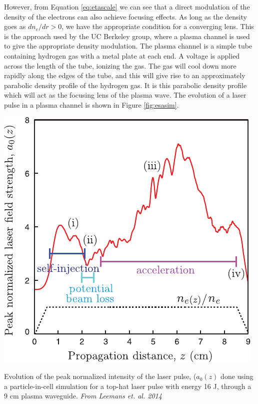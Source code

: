 \documentclass[12pt,letter]{article}
\begin{document}
    However, from Equation \eqref{eq:etascale} we can see that a direct
    modulation of the density of the electrons can also achieve focusing
    effects. As long as the density goes as $dn_e/dr >0$, we have the
    appropriate condition for a converging lens. This is the approach used by
    the UC Berkeley group, where a plasma channel is used to give the
    appropriate density modulation. The plasma channel is a simple tube containing
hydrogen gas with a metal plate at each end. A voltage is applied across the
length of the tube, ionizing the gas. The gas will cool down more rapidly along
the edges of the tube, and this will give rise to an approximately parabolic
density profile of the hydrogen
gas\cite{PhysRevLett.89.185003,PhysRevE.63.015401}. It is this parabolic density profile which
will act as the focusing lens of the plasma wave. The evolution of a laser pulse
in a plasma channel is shown in Figure \ref{fig:esasim}. 
\begin{marginfigure}
	\includegraphics[width=\marginparwidth]{../figures/esareycapfield.pdf}
    \caption{Evolution of the peak normalized intensity of the laser pulse,
    ($a_0(z)$ done using a particle-in-cell simulation for a top-hat laser pulse
    with energy 16 J, through a 9 \si{cm} plasma waveguide. {\em From Leemans
et. al. 2014 \cite{PhysRevLett.113.245002}}\label{fig:esasim}}
\end{marginfigure}
\end{document}
